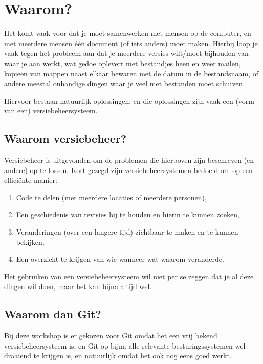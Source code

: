 \section{Waarom?}
Het komt vaak voor dat je moet samenwerken met mensen op de computer, en met meerdere mensen \'e\'en document (of iets anders) moet maken. Hierbij loop je vaak tegen het probleem aan dat je meerdere versies wilt/moet bijhouden van waar je aan werkt, wat gedoe oplevert met bestandjes heen en weer mailen, kopie\"en van mappen naast elkaar bewaren met de datum in de bestandsnaam, of andere meestal onhandige dingen waar je veel met bestanden moet schuiven.

Hiervoor bestaan natuurlijk oplossingen, en die oplossingen zijn vaak een (vorm van een) versiebeheersysteem.

\subsection{Waarom versiebeheer?}
Versiebeheer is uitgevonden om de problemen die hierboven zijn beschreven (en andere) op te lossen. Kort gezegd zijn versiebeheersystemen bedoeld om op een effici\"ente manier:
\begin{enumerate}
	\item Code te delen (met meerdere locaties of meerdere personen),
	\item Een geschiedenis van revisies bij te houden en hierin te kunnen zoeken,
	\item Veranderingen (over een langere tijd) zichtbaar te maken en te kunnen bekijken,
	\item Een overzicht te krijgen van wie wanneer wat waarom veranderde.
\end{enumerate}

Het gebruiken van een versiebeheersysteem wil niet per se zeggen dat je al deze dingen wil doen, maar het kan bijna altijd wel.

\subsection{Waarom dan Git?}
Bij deze workshop is er gekozen voor Git omdat het een vrij bekend versiebeheersysteem is, en Git op bijna alle relevante besturingssystemen wel draaiend te krijgen is, en natuurlijk omdat het ook nog eens goed werkt.

